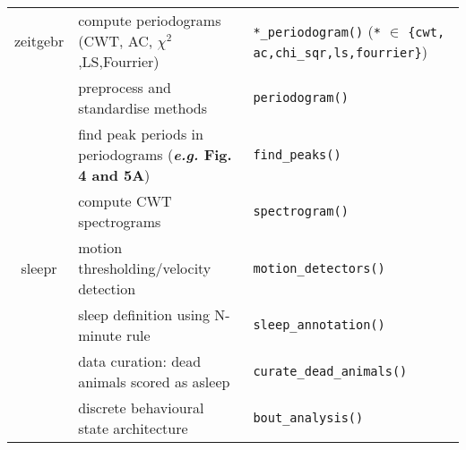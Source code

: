 \documentclass{standalone}
\begin{document}
\begin{tabular}{|l|l|l|}
	\multicolumn{ 1}{|c|}{zeitgebr} & compute periodograms (CWT, AC, $\chi^2$,LS,Fourrier) & \small{\texttt{*\_periodogram()} (\texttt{*} $\in$ \texttt{\{cwt, ac,chi\_sqr,ls,fourrier\}})}\\ \cline{ 2- 3}
	\multicolumn{ 1}{|l|}{} & preprocess and standardise methods & \texttt{periodogram()} \\ \cline{ 2- 3}
	\multicolumn{ 1}{|l|}{} & find peak periods in periodograms (\textbf{\emph{e.g.} Fig. 4 and 5A}) & \texttt{find\_peaks()} \\ \cline{ 2- 3}
	\multicolumn{ 1}{|l|}{} & compute CWT spectrograms & \texttt{spectrogram()} \\ \hline	
	\multicolumn{ 1}{|c|}{sleepr} & motion thresholding/velocity detection & \texttt{motion\_detectors()}  \\ \cline{ 2- 3}
	\multicolumn{ 1}{|l|}{} & sleep definition using N-minute rule & \texttt{sleep\_annotation()} \\ \cline{ 2- 3}
	\multicolumn{ 1}{|l|}{} & data curation: dead animals scored as asleep & \texttt{curate\_dead\_animals()} \\ \cline{ 2- 3}
	\multicolumn{ 1}{|l|}{} & discrete behavioural state architecture & \texttt{bout\_analysis()} \\ \hline
\end{tabular}
\end{document}
